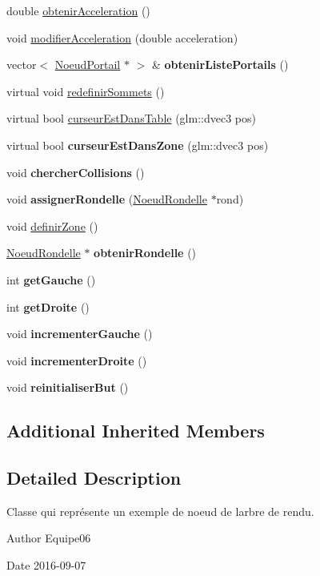 \begin{DoxyCompactItemize}
\item 
double \hyperlink{group__inf2990_ga28011811ced7c04906780070a7762ec3}{obtenir\+Acceleration} ()
\item 
void \hyperlink{group__inf2990_ga1ac0745a780e04a265ee01bec42210e1}{modifier\+Acceleration} (double acceleration)
\item 
vector$<$ \hyperlink{class_noeud_portail}{Noeud\+Portail} $\ast$ $>$ \& {\bfseries obtenir\+Liste\+Portails} ()
\item 
virtual void \hyperlink{group__inf2990_ga37c3779e4662401c1ed6fb64de2c43bf}{redefinir\+Sommets} ()
\item 
virtual bool \hyperlink{group__inf2990_ga4e59d47514e12d1bdcf3047ecc4230c9}{curseur\+Est\+Dans\+Table} (glm\+::dvec3 pos)
\item 
virtual bool {\bfseries curseur\+Est\+Dans\+Zone} (glm\+::dvec3 pos)
\item 
void {\bfseries chercher\+Collisions} ()
\item 
void {\bfseries assigner\+Rondelle} (\hyperlink{class_noeud_rondelle}{Noeud\+Rondelle} $\ast$rond)
\item 
void \hyperlink{group__inf2990_ga74c94e6298b50f2ce1b893da20d9662b}{definir\+Zone} ()
\item 
\hyperlink{class_noeud_rondelle}{Noeud\+Rondelle} $\ast$ {\bfseries obtenir\+Rondelle} ()
\item 
int {\bfseries get\+Gauche} ()
\item 
int {\bfseries get\+Droite} ()
\item 
void {\bfseries incrementer\+Gauche} ()
\item 
void {\bfseries incrementer\+Droite} ()
\item 
void {\bfseries reinitialiser\+But} ()
\end{DoxyCompactItemize}
\subsection*{Additional Inherited Members}


\subsection{Detailed Description}
Classe qui représente un exemple de noeud de l\textquotesingle{}arbre de rendu. 

\begin{DoxyAuthor}{Author}
Equipe06 
\end{DoxyAuthor}
\begin{DoxyDate}{Date}
2016-\/09-\/07 
\end{DoxyDate}



